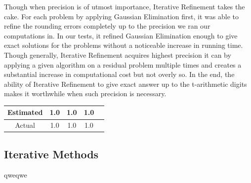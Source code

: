 \documentclass[11pt]{article}	%
\begin{document}
Though when precision is of utmost importance, Iterative Refinement takes the cake. For each problem by applying Gaussian Elimination first, it was able to refine the rounding errors completely up to the precision we ran our computations in. In our tests, it refined Gaussian Elimination enough to give exact solutions for the problems without a noticeable increase in running time. Though generally, Iterative Refinement acquires highest precision it can by applying a given algorithm on a residual problem multiple times and creates a substantial increase in computational cost but not overly so. In the end, the ability of Iterative Refinement to give exact answer up to the t-arithmetic digits makes it worthwhile when such precision is necessary.

\begin{center}
	 \label{tab:title}
    \begin{tabular}{||c|c|c|c|c||}
        \hline
        \multirow{2}{5em}{Estimated} & 1.0 & 1.0 &  1.0 \\ [.25em]
        \hline\hline
        \multirow{2}{5em}{Actual} & 1.0 & 1.0 & 1.0 \\ [.25em]
        \hline
    \end{tabular}
\end{center}\subsection{Iterative Methods}
qweqwe
\end{document}
